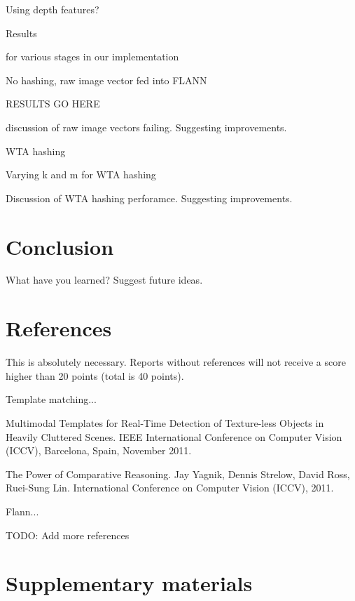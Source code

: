 \documentclass[10pt,twocolumn,letterpaper]{article}
\begin{document}
Using depth features?

Results

for various stages in our implementation

No hashing, raw image vector fed into FLANN

RESULTS GO HERE

discussion of raw image vectors failing. Suggesting improvements.

WTA hashing 

Varying k and m for WTA hashing

Discussion of WTA hashing perforamce. Suggesting improvements.

\section{Conclusion}

What have you learned? Suggest future ideas.

\section{References}

This is absolutely necessary. Reports without references will not receive a score higher than 20 points (total is 40 points).

Template matching...

Multimodal Templates for Real-Time Detection of Texture-less Objects in Heavily Cluttered Scenes. IEEE International Conference on Computer Vision (ICCV), Barcelona, Spain, November 2011.

The Power of Comparative Reasoning. Jay Yagnik, Dennis Strelow, David Ross, Ruei-Sung Lin. International Conference on Computer Vision (ICCV), 2011.

Flann...


TODO: Add more references

\section{Supplementary materials}
\end{document}
